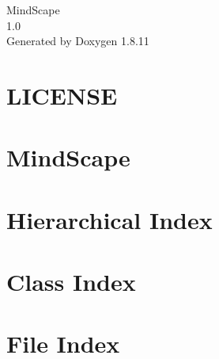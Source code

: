 \documentclass[twoside]{book}
\newcommand{\+}{\discretionary{\mbox{\scriptsize$\hookleftarrow$}}{}{}}
\newcommand{\clearemptydoublepage}{%
  \newpage{\pagestyle{empty}\cleardoublepage}%
}
\begin{document}
\hypersetup{pageanchor=false,
             bookmarksnumbered=true,
             pdfencoding=unicode
            }
\begin{titlepage}
\vspace*{7cm}
\begin{center}%
{\Large Mind\+Scape \\[1ex]\large 1.\+0 }\\
\vspace*{1cm}
{\large Generated by Doxygen 1.8.11}\\
\end{center}
\end{titlepage}
\clearemptydoublepage
\tableofcontents
\clearemptydoublepage
{}
\hypersetup{pageanchor=true}

\chapter{L\+I\+C\+E\+N\+SE}
\label{md_LICENSE}
\hypertarget{md_LICENSE}{}

\chapter{Mind\+Scape}
\label{md_README}
\hypertarget{md_README}{}

\chapter{Hierarchical Index}

\chapter{Class Index}

\chapter{File Index}

\end{document}

